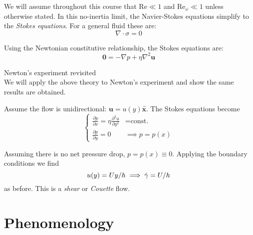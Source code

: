 \documentclass{jknotes}
\begin{document}
We will assume throughout this course that $\text{Re} \ll 1$ and
$\text{Re}_\omega \ll 1$ unless otherwise stated. In this no-inertia limit,
the Navier-Stokes equations simplify to the \emph{Stokes equations}. For a
general fluid these are:
\begin{equation}
	\nabla \cdot \sigma = 0
\end{equation}

Using the Newtonian constitutive relationship, the Stokes equations are:
\begin{equation}
	\symbf{0} = -\nabla p + \eta \nabla^2 \symbf{u}
\end{equation}

\begin{eg}{Newton's experiment revisited\\}
	We will apply the above theory to Newton's experiment and show the same
	results are obtained.

	\begin{center}
	\end{center}

	Assume the flow is unidirectional: $\symbf{u} = u(y) \hat{\symbf{x}}$. The
	Stokes equations become
	\begin{equation}
	\begin{cases}
		\frac{\partial p}{\partial x} = \eta \frac{\partial^2 u}{\partial y^2}
		& = \text{const.}
		\\
		\frac{\partial  p}{\partial y} = 0 & \implies p=p(x)
	\end{cases}
	\end{equation}

	Assuming there is no net pressure drop, $p = p(x) \equiv 0$. Applying the
	boundary conditions we find 
	\begin{equation}
		u(y) = Uy/h \implies \dot{\gamma} = U/h
	\end{equation}
	as before. This is a \emph{shear} or \emph{Couette} flow.
\end{eg}

\section{Phenomenology}
\end{document}
